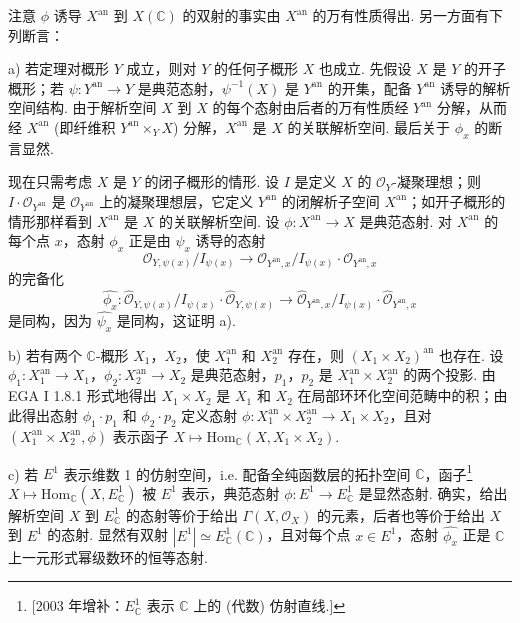 注意 $\phi$ 诱导 $X^{\mathrm{an}}$ 到 $X(\mathbb{C})$ 的双射的事实由 $X^{\mathrm{an}}$ 的万有性质得出. 另一方面有下列断言：

a) 若定理对概形 $Y$ 成立，则对 $Y$ 的任何子概形 $X$ 也成立. 先假设 $X$ 是 $Y$ 的开子概形；若 $\psi \colon Y^{\mathrm{an}} \to Y$ 是典范态射，$\psi^{-1}(X)$ 是 $Y^{\mathrm{an}}$ 的开集，配备 $Y^{\mathrm{an}}$ 诱导的解析空间结构. 由于解析空间 $X$ 到 $X$ 的每个态射由后者的万有性质经 $Y^{\mathrm{an}}$ 分解，从而经 $X^{\mathrm{an}}$ (即纤维积 $Y^{\mathrm{an}} \times_Y X$) 分解，$X^{\mathrm{an}}$ 是 $X$ 的关联解析空间. 最后关于 $\phi_x$ 的断言显然.

现在只需考虑 $X$ 是 $Y$ 的闭子概形的情形. 设 $I$ 是定义 $X$ 的 $\mathcal{O}_Y$-凝聚理想；则 $I \cdot \mathcal{O}_{Y^{\mathrm{an}}}$ 是 $\mathcal{O}_{Y^{\mathrm{an}}}$ 上的凝聚理想层，它定义 $Y^{\mathrm{an}}$ 的闭解析子空间 $X^{\mathrm{an}}$；如开子概形的情形那样看到 $X^{\mathrm{an}}$ 是 $X$ 的关联解析空间. 设 $\phi \colon X^{\mathrm{an}} \to X$ 是典范态射. 对 $X^{\mathrm{an}}$ 的每个点 $x$，态射 $\phi_x$ 正是由 $\psi_x$ 诱导的态射
\[
\mathcal{O}_{Y,\psi(x)}/I_{\psi(x)} \longrightarrow \mathcal{O}_{Y^{\mathrm{an}},x}/I_{\psi(x)} \cdot \mathcal{O}_{Y^{\mathrm{an}},x}
\]
的完备化
\[
\widehat{\phi_x} \colon \widehat{\mathcal{O}}_{Y,\psi(x)}/I_{\psi(x)} \cdot \widehat{\mathcal{O}}_{Y,\psi(x)} \longrightarrow \widehat{\mathcal{O}}_{Y^{\mathrm{an}},x}/I_{\psi(x)} \cdot \widehat{\mathcal{O}}_{Y^{\mathrm{an}},x}
\]
是同构，因为 $\widehat{\psi_x}$ 是同构，这证明 a).

b) 若有两个 $\mathbb{C}$-概形 $X_1$，$X_2$，使 $X_1^{\mathrm{an}}$ 和 $X_2^{\mathrm{an}}$ 存在，则 $(X_1 \times X_2)^{\mathrm{an}}$ 也存在. 设 $\phi_1 \colon X_1^{\mathrm{an}} \to X_1$，$\phi_2 \colon X_2^{\mathrm{an}} \to X_2$ 是典范态射，$p_1$，$p_2$ 是 $X_1^{\mathrm{an}} \times X_2^{\mathrm{an}}$ 的两个投影. 由 EGA I 1.8.1 形式地得出 $X_1 \times X_2$ 是 $X_1$ 和 $X_2$ 在局部环环化空间范畴中的积；由此得出态射 $\phi_1 \cdot p_1$ 和 $\phi_2 \cdot p_2$ 定义态射 $\phi \colon X_1^{\mathrm{an}} \times X_2^{\mathrm{an}} \to X_1 \times X_2$，且对 $(X_1^{\mathrm{an}} \times X_2^{\mathrm{an}}, \phi)$ 表示函子 $X \mapsto \mathrm{Hom}_{\mathbb{C}}(X, X_1 \times X_2)$.

c) 若 $E^1$ 表示维数 1 的仿射空间，i.e. 配备全纯函数层的拓扑空间 $\mathbb{C}$，函子\footnote{[2003 年增补：$E^1_{\mathbb{C}}$ 表示 $\mathbb{C}$ 上的 (代数) 仿射直线.]} $X \mapsto \mathrm{Hom}_{\mathbb{C}}(X, E^1_{\mathbb{C}})$ 被 $E^1$ 表示，典范态射 $\phi \colon E^1 \to E^1_{\mathbb{C}}$ 是显然态射. 确实，给出解析空间 $X$ 到 $E^1_{\mathbb{C}}$ 的态射等价于给出 $\Gamma(X, \mathcal{O}_X)$ 的元素，后者也等价于给出 $X$ 到 $E^1$ 的态射. 显然有双射 $|E^1| \simeq E^1_{\mathbb{C}}(\mathbb{C})$，且对每个点 $x \in E^1$，态射 $\widehat{\phi_x}$ 正是 $\mathbb{C}$ 上一元形式幂级数环的恒等态射.

